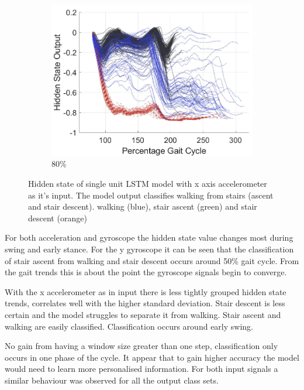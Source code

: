 \documentclass[sensors,article,submit,moreauthors,pdftex]{Definitions/mdpi}
\begin{document}
\begin{figure}[!hbt]
     \begin{subfigure}[b]{0.32\textwidth}
         \centering
         \includegraphics[width=\textwidth]{Figures/results/hidden_state/accel_x_w_v_sa-sd/80_Participant_04.jpg}
         \caption{80\%}
         \label{subfig:e}
     \end{subfigure}
    \caption{Hidden state of single unit LSTM model with x axis accelerometer as it's input. The model output classifies walking from stairs (ascent and stair descent). walking (blue), stair ascent (green) and stair descent (orange)}
    \label{fig:hidden-state-accel-x-w_v_sa-sd}
\end{figure}

For both acceleration and gyroscope the hidden state value changes most during swing and early stance. For the y gyroscope it can be seen that the classification of stair ascent from walking and stair descent occurs around 50\% gait cycle. From the gait trends this is about the point the gyroscope signals begin to converge. 

With the x accelerometer as in input there is less tightly grouped hidden state trends, correlates well with the higher standard deviation. Stair descent is less certain and the model struggles to separate it from walking. Stair ascent and walking are easily classified. Classification occurs around early swing.

No gain from having a window size greater than one step, classification only occurs in one phase of the cycle. It appear that to gain higher accuracy the model would need to learn more personalised information. For both input signals a similar behaviour was observed for all the output class sets.
\end{document}

